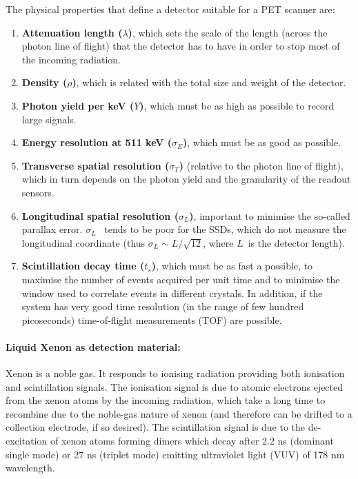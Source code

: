 \documentclass{JINST}
\begin{document}
The physical properties that define a detector suitable for a PET scanner are: 
\begin{enumerate}
\item {\bf Attenuation length ($\lambda$)}, which sets the scale of the length (across the photon line of flight) that the detector has to have in order to stop most of the incoming radiation.
\item {\bf Density ($\rho$)}, which is related with the total size and weight of the detector.
\item {\bf Photon yield per keV ($Y$)}, which must be as high as possible to record large signals. 
\item {\bf Energy resolution at 511 keV ($\sigma_E$)}, which must be as good as possible. 
\item {\bf Transverse spatial resolution ($\sigma_T$)} (relative to the photon line of flight), which in turn depends on the photon yield and the granularity of the readout sensors.
\item {\bf Longitudinal spatial resolution ($\sigma_L$)}, important to minimise the so-called parallax error.  $\sigma_L$~  tends to be poor for the SSDs, which do not measure the longitudinal coordinate (thus $\sigma_L \sim L/\sqrt{12}$, where $L$~is the detector length). 
\item {\bf Scintillation decay time ($t_s$)}, which must be as fast a possible, to maximise the number of events acquired per unit time and to minimise the window used to correlate events in different crystals. In addition, if the system has very good time resolution (in the range of few hundred picoseconds) time-of-flight measurements (TOF) are possible.  
\end{enumerate}


\paragraph{Liquid Xenon as detection material:}

Xenon is a noble gas. It responds to ionising radiation providing both ionisation and scintillation signals. The ionisation signal is due to atomic electrons ejected from the xenon atoms by the incoming radiation, which take a long time to recombine due to the noble-gas nature of xenon (and therefore can be drifted to a collection electrode, if so desired). The scintillation signal is due to the de-excitation of xenon atoms forming dimers which decay after 2.2 ns (dominant single mode) or 27 ns (triplet mode) emitting ultraviolet light (VUV) of 178 nm wavelength.
\end{document}
